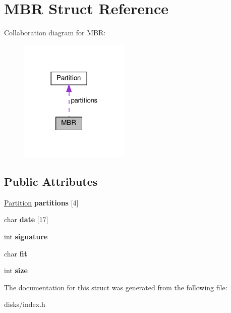 \hypertarget{structMBR}{}\section{M\+BR Struct Reference}
\label{structMBR}


Collaboration diagram for M\+BR\+:\nopagebreak
\begin{figure}[H]
\begin{center}
\leavevmode
\includegraphics[width=149pt]{structMBR__coll__graph}
\end{center}
\end{figure}
\subsection*{Public Attributes}
\begin{DoxyCompactItemize}
\item 
\mbox{\label{structMBR_aeb9fb3879f3fe8f907e4da6926807c39}} 
\hyperlink{structPartition}{Partition} {\bfseries partitions} \mbox{[}4\mbox{]}
\item 
\mbox{\label{structMBR_ab2c49558e385fffabd122d10137f100a}} 
char {\bfseries date} \mbox{[}17\mbox{]}
\item 
\mbox{\label{structMBR_a95adb1d5b9f1b47d9c2f8d1280eef7ab}} 
int {\bfseries signature}
\item 
\mbox{\label{structMBR_a4ea809a4b447f6c7bb9f37835b0d42c7}} 
char {\bfseries fit}
\item 
\mbox{\label{structMBR_ab66bd5bedf898f05b844d19cb1b31134}} 
int {\bfseries size}
\end{DoxyCompactItemize}


The documentation for this struct was generated from the following file\+:\begin{DoxyCompactItemize}
\item 
disks/index.\+h\end{DoxyCompactItemize}
